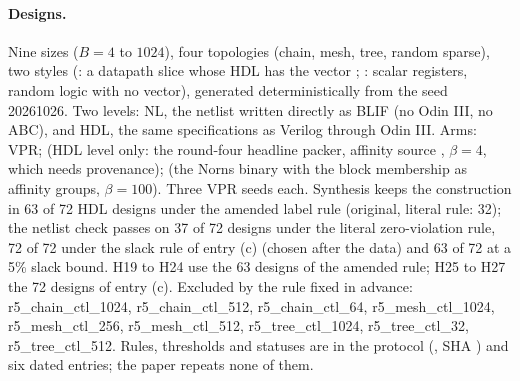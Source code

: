 \paragraph{Designs.} Nine sizes ($B=4$ to $1024$), four topologies (chain, mesh, tree, random sparse), two styles (: a datapath slice whose HDL has the vector ; : scalar registers, random logic with no vector), generated deterministically from the seed 20261026. Two levels: NL, the netlist written directly as BLIF (no Odin III, no ABC), and HDL, the same specifications as Verilog through Odin III. Arms:  VPR;  (HDL level only: the round-four headline packer, affinity source , $\beta=4$, which needs provenance);  (the Norns binary with the block membership as affinity groups, $\beta=100$). Three VPR seeds each. Synthesis keeps the construction in 63 of 72 HDL designs under the amended label rule (original, literal rule: 32); the netlist check passes on 37 of 72 designs under the literal zero-violation rule, 72 of 72 under the slack rule of entry (c) (chosen after the data) and 63 of 72 at a 5\% slack bound. H19 to H24 use the 63 designs of the amended rule; H25 to H27 the 72 designs of entry (c). Excluded by the rule fixed in advance: r5\_chain\_ctl\_1024, r5\_chain\_ctl\_512, r5\_chain\_ctl\_64, r5\_mesh\_ctl\_1024, r5\_mesh\_ctl\_256, r5\_mesh\_ctl\_512, r5\_tree\_ctl\_1024, r5\_tree\_ctl\_32, r5\_tree\_ctl\_512.
Rules, thresholds and statuses are in the protocol (, SHA ) and six dated entries; the paper repeats none of them.
